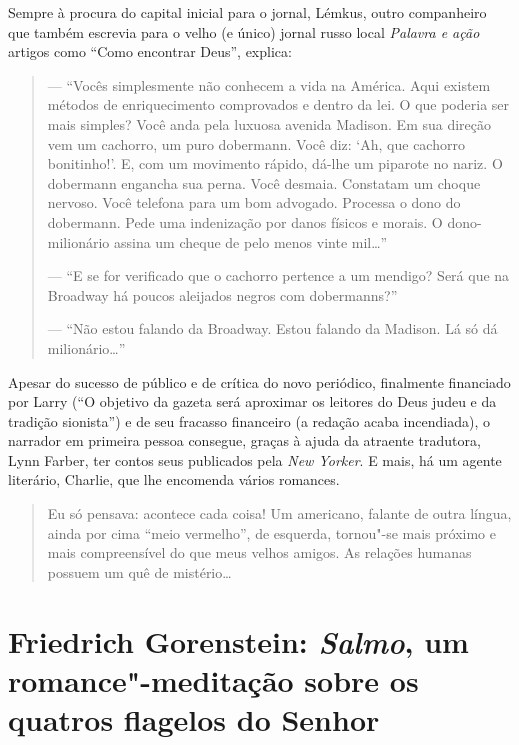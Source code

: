 {Sempre à procura do capital inicial para o jornal, Lémkus, outro companheiro que também escrevia para o velho (e único) jornal russo local \emph{Palavra e ação} artigos como ``Como encontrar Deus'', explica:

\begin{quote}
--- ``Vocês simplesmente não conhecem a vida na América. Aqui existem métodos de enriquecimento comprovados e dentro da lei. O que poderia ser mais simples? Você anda pela luxuosa avenida Madison. Em sua direção vem um cachorro, um puro dobermann. Você diz: `Ah, que cachorro bonitinho!'. E, com um movimento rápido, dá-lhe um piparote no nariz. O dobermann engancha sua perna. Você desmaia. Constatam um choque nervoso. Você telefona para um bom advogado. Processa o dono do dobermann. Pede uma indenização por danos físicos e morais. O dono-milionário assina um cheque de pelo menos vinte mil\ldots{}''

--- ``E se for verificado que o cachorro pertence a um mendigo? Será que na Broadway há poucos aleijados negros com dobermanns?''

--- ``Não estou falando da Broadway. Estou falando da Madison. Lá só dá milionário\ldots{}''
\end{quote}

Apesar do sucesso de público e de crítica do novo periódico, finalmente financiado por Larry (``O objetivo da gazeta será aproximar os leitores do Deus judeu e da tradição sionista'') e de seu fracasso financeiro (a redação acaba incendiada), o narrador em primeira pessoa consegue, graças à ajuda da atraente tradutora, Lynn Farber, ter contos seus  publicados pela \emph{New Yorker}. E mais, há um agente literário, Charlie, que lhe encomenda vários romances.

\begin{quote}
Eu só pensava: acontece cada coisa! Um americano, falante de outra língua, ainda por cima ``meio vermelho'', de esquerda, tornou"-se mais próximo e mais compreensível do que meus velhos amigos. As relações humanas possuem um quê de mistério\ldots{}
\end{quote}

\chapter*{Friedrich Gorenstein: \emph{Salmo}, um romance"-meditação sobre os quatros flagelos do Senhor}


}
